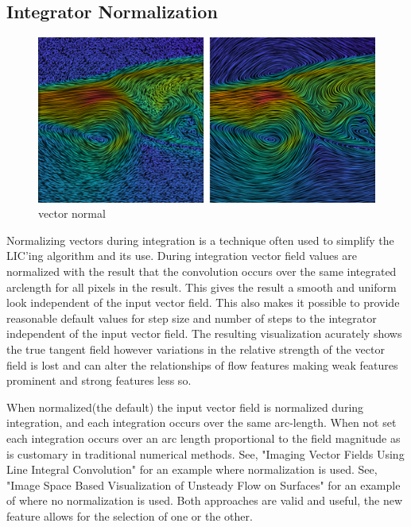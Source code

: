 \documentclass[a4paper,10pt]{article}
\begin{document}
\subsection{Integrator Normalization}
\begin{figure}[h]
 \centering
 \includegraphics[width=\textwidth]{./images-data/vector-norm/vec-norm.png}
 \caption{vector normal}
 \label{fig:vec-norm}
\end{figure}


Normalizing vectors during integration is a technique often used to simplify the LIC'ing algorithm and its use. During integration vector field values are normalized with the result that the convolution occurs over the same integrated arclength for all pixels in the result. This gives the result a smooth and uniform look independent of the input vector field. This also makes it possible to provide reasonable default values for step size and number of steps to the integrator independent of the input vector field. The resulting visualization acurately shows the true tangent field however variations in the relative strength of the vector field is lost and can alter the relationships of flow features making weak features prominent and strong features less so.

When normalized(the default) the input vector field is normalized during integration, and each integration occurs over the same arc-length. When not set each integration occurs over an arc length proportional to the field magnitude as is customary in traditional numerical methods. See, "Imaging Vector Fields Using Line Integral Convolution" for an example where normalization is used. See, "Image Space Based Visualization of Unsteady Flow on Surfaces" for an example of where no normalization is used. Both approaches are valid and useful, the new feature allows for the selection of one or the other.
\end{document}
